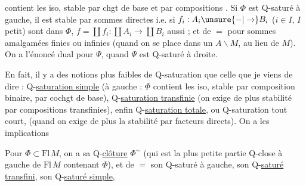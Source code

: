 
contient les iso, stable par chgt de base et par compositions
. Si $\Phi$ est Q-saturé à gauche, il est stable par
 sommes directes i.e. si 
$f_i:A_i\unsure{-|\to}B_i$ ($i\in I$, $I$ petit) sont dans $\Phi$,
$f=\coprod f_i:\coprod A_i\longrightarrow\coprod B_i$ aussi ;
et de $=$ pour  sommes amalgamées finies ou
infinies (quand on se place dans un $A\backslash M$, au lieu de $M$).
On a l'énoncé dual pour $\Psi$, quand $\Psi$ est Q-saturé à droite.

En fait, il y a des notions plus faibles de Q-saturation que celle
que je viens de dire : Q-\uline{saturation simple} (à gauche :
$\Phi$ contient les iso, stable par composition binaire, par
cochgt de base), Q-\uline{saturation transfinie} (on exige de plus
stabilité par compositions transfinies), enfin Q-\uline{saturation
totale}, ou Q-saturation tout court\unsure{\S|)}, (quand on exige de
plus la stabilité par facteurs directs). On a les implications

 Pour $\Phi\subset\mathrm{Fl}\,M$, on a sa
Q-\uline{clôture}  $\Phi^{\sim}$
(qui est la plus petite partie Q-close à gauche de
$\mathrm{Fl}\,M$ contenant $\Phi$), et de $=$ son Q-saturé
 à gauche, son Q-\uline{saturé transfini}, son
Q-\uline{saturé simple},
